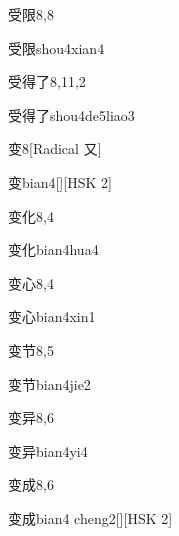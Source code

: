 \begin{entry}{受限}{8,8}
  \begin{phonetics}{受限}{shou4xian4}
  \end{phonetics}
\end{entry}

\begin{entry}{受得了}{8,11,2}
  \begin{phonetics}{受得了}{shou4de5liao3}
  \end{phonetics}
\end{entry}

\begin{entry}{变}{8}[Radical 又]
  \begin{phonetics}{变}{bian4}[][HSK 2]
  \end{phonetics}
\end{entry}

\begin{entry}{变化}{8,4}
  \begin{phonetics}{变化}{bian4hua4}
  \end{phonetics}
\end{entry}

\begin{entry}{变心}{8,4}
  \begin{phonetics}{变心}{bian4xin1}
  \end{phonetics}
\end{entry}

\begin{entry}{变节}{8,5}
  \begin{phonetics}{变节}{bian4jie2}
  \end{phonetics}
\end{entry}

\begin{entry}{变异}{8,6}
  \begin{phonetics}{变异}{bian4yi4}
  \end{phonetics}
\end{entry}

\begin{entry}{变成}{8,6}
  \begin{phonetics}{变成}{bian4 cheng2}[][HSK 2]
  \end{phonetics}
\end{entry}

